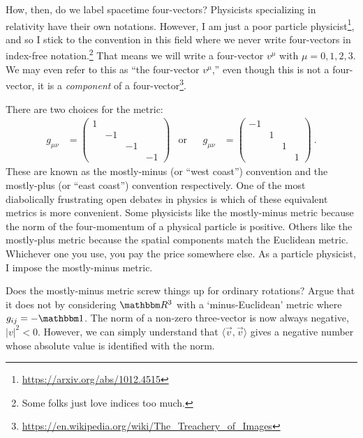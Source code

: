 \documentclass[12pt]{article}
\begin{document}
How, then, do we label spacetime four-vectors? Physicists specializing in relativity have their own notations. However, I am just a poor particle physicist\footnote{\url{https://arxiv.org/abs/1012.4515}}, and so I stick to the convention in this field where we never write four-vectors in index-free notation.\footnote{Some folks just love indices too much.} That means we will write a four-vector $v^\mu$ with $\mu=0,1,2,3$. We may even refer to this as ``the four-vector $v^\mu$,'' even though this is not a four-vector, it is a \emph{component} of a four-vector\footnote{\url{https://en.wikipedia.org/wiki/The_Treachery_of_Images}}.

There are two choices for the metric:
\begin{align}
    g_{\mu\nu} &= 
    \begin{pmatrix}
        1 & & & \\
        & -1 & & \\
        & & -1 & \\
        & & & -1 
    \end{pmatrix}
    & \text{or}&
    &
    g_{\mu\nu} &= 
    \begin{pmatrix}
        -1 & & & \\
        & 1 & & \\
        & & 1 & \\
        & & & 1 
    \end{pmatrix} \ .
\end{align}
These are known as the mostly-minus (or ``west coast'') convention and the mostly-plus (or ``east coast'') convention respectively. One of the most diabolically frustrating open debates in physics is which of these equivalent metrics is more convenient. Some physicists like the mostly-minus metric because the norm of the four-momentum of a physical particle is positive. Others like the mostly-plus metric because the spatial components match the Euclidean metric. Whichever one you use, you pay the price somewhere else. As a particle physicist, I impose the mostly-minus metric.

\begin{exercise}
Does the mostly-minus metric screw things up for ordinary rotations? Argue that it does not by considering $\RR^3$ with a `minus-Euclidean' metric where $g_{ij} = -\one$. The norm of a non-zero three-vector is now always negative, $|v|^2 < 0$. However, we can simply understand that $\langle \vec{v},\vec{v}\rangle$ gives a negative number whose absolute value is identified with the norm. 
\end{exercise}
\end{document}
